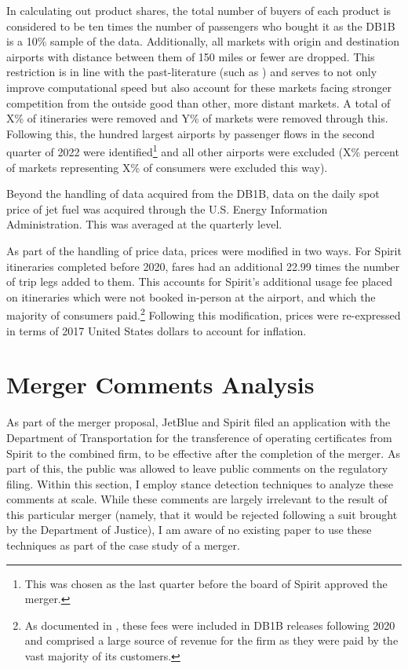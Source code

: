 \documentclass{article}
\begin{document}
\begin{appendices}
	In calculating out product shares, the total number of buyers of each product is considered to be ten times the number of passengers who bought it as the DB1B is a 10\% sample of the data. Additionally, all markets with origin and destination airports with distance between them of 150 miles or fewer are dropped. This restriction is in line with the past-literature (such as \citet{ciliberto_does_2014}) and serves to not only improve computational speed but also account for these markets facing stronger competition from the outside good than other, more distant markets. A total of {X}\% of itineraries were removed and Y\% of markets were removed through this. Following this, the hundred largest airports by passenger flows in the second quarter of 2022 were identified\footnote{This was chosen as the last quarter before the board of Spirit approved the merger.} and all other airports were excluded (X\% percent of markets representing X\% of consumers were excluded this way). 
	
	Beyond the handling of data acquired from the DB1B, data on the daily spot price of jet fuel was acquired through the U.S. Energy Information Administration. This was averaged at the quarterly level. 
	
	As part of the handling of price data, prices were modified in two ways. For Spirit itineraries completed before 2020, fares had an additional 22.99 times the number of trip legs added to them. This accounts for Spirit's additional usage fee placed on itineraries which were not booked in-person at the airport, and which the majority of consumers paid.\footnote{As documented in \citet{shrago_spirit_2024}, these fees were included in DB1B releases following 2020 and comprised a large source of revenue for the firm as they were paid by the vast majority of its customers.} Following this modification, prices were re-expressed in terms of 2017 United States dollars to account for inflation.
	
	\section{Merger Comments Analysis}
	\label{sec:NaturalLanguage}

As part of the merger proposal, JetBlue and Spirit filed an application with the Department of Transportation for the transference of operating certificates from Spirit to the combined firm, to be effective after the completion of the merger. As part of this, the public was allowed to leave public comments on the regulatory filing. Within this section, I employ stance detection techniques to analyze these comments at scale. While these comments are largely irrelevant to the result of this particular merger (namely, that it would be rejected following a suit brought by the Department of Justice), I am aware of no existing paper to use these techniques as part of the case study of a merger. 


\end{appendices}
\end{document}
